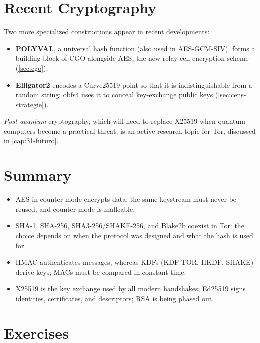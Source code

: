 \section{Recent Cryptography}\label{sec:cripto-recente}

Two more specialized constructions appear in recent developments:
\begin{itemize}
  \item \textbf{POLYVAL}, a universal hash function (also used in AES-GCM-SIV), forms a building block of CGO alongside AES, the new relay-cell encryption scheme (\cref{sec:cgo});
  \item \textbf{Elligator2} encodes a Curve25519 point so that it is indistinguishable from a random string; obfs4 uses it to conceal key-exchange public keys (\cref{sec:cens-strategie}).
\end{itemize}
\emph{Post-quantum} cryptography, which will need to replace X25519 when quantum computers become a practical threat, is an active research topic for Tor, discussed in \cref{cap:31-futuro}.

\section*{Summary}
\begin{itemize}
  \item AES in counter mode encrypts data; the same keystream must never be reused, and counter mode is malleable.
  \item SHA-1, SHA-256, SHA3-256/SHAKE-256, and Blake2b coexist in Tor: the choice depends on when the protocol was designed and what the hash is used for.
  \item HMAC authenticates messages, whereas KDFs (KDF-TOR, HKDF, SHAKE) derive keys; MACs must be compared in constant time.
  \item X25519 is the key exchange used by all modern handshakes; Ed25519 signs identities, certificates, and descriptors; RSA is being phased out.
\end{itemize}

\section*{Exercises}

